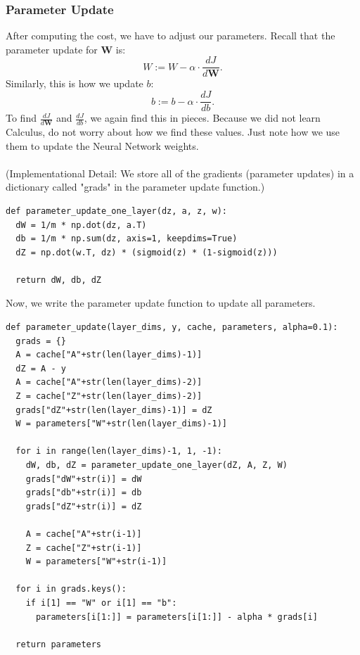 \documentclass{article}
\begin{document}
\subsubsection{Parameter Update}
After computing the cost, we have to adjust our parameters. Recall that the parameter update for $\textbf{W}$ is:
$$W:=W-\alpha\cdot \frac{dJ}{d\textbf{W}}.$$
Similarly, this is how we update $b$:
$$b:=b-\alpha\cdot \frac{dJ}{db}.$$
To find $\frac{dJ}{d\textbf{W}}$ and $\frac{dJ}{db}$, we again find this in pieces. Because we did not learn Calculus, do not worry about how we find these values. Just note how we use them to update the Neural Network weights.
\\
\\
(Implementational Detail: We store all of the gradients (parameter updates) in a dictionary called "grads" in the parameter update function.)
\begin{lstlisting}
def parameter_update_one_layer(dz, a, z, w):
  dW = 1/m * np.dot(dz, a.T)
  db = 1/m * np.sum(dz, axis=1, keepdims=True)
  dZ = np.dot(w.T, dz) * (sigmoid(z) * (1-sigmoid(z)))

  return dW, db, dZ
\end{lstlisting}

Now, we write the parameter update function to update all parameters.
\begin{lstlisting}
def parameter_update(layer_dims, y, cache, parameters, alpha=0.1):
  grads = {}
  A = cache["A"+str(len(layer_dims)-1)]
  dZ = A - y
  A = cache["A"+str(len(layer_dims)-2)]
  Z = cache["Z"+str(len(layer_dims)-2)]
  grads["dZ"+str(len(layer_dims)-1)] = dZ
  W = parameters["W"+str(len(layer_dims)-1)]

  for i in range(len(layer_dims)-1, 1, -1):
    dW, db, dZ = parameter_update_one_layer(dZ, A, Z, W)
    grads["dW"+str(i)] = dW
    grads["db"+str(i)] = db
    grads["dZ"+str(i)] = dZ

    A = cache["A"+str(i-1)]
    Z = cache["Z"+str(i-1)]
    W = parameters["W"+str(i-1)]
  
  for i in grads.keys():
    if i[1] == "W" or i[1] == "b":
      parameters[i[1:]] = parameters[i[1:]] - alpha * grads[i]
  
  return parameters
\end{lstlisting}
\end{document}

